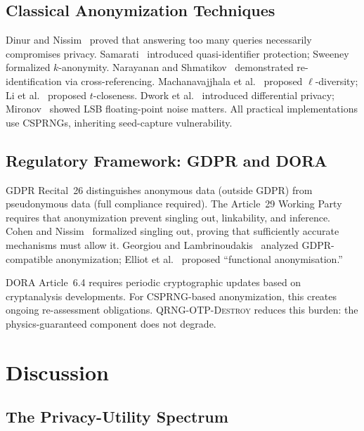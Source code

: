 \documentclass[acmsmall,screen,review,anonymous]{acmart}
\begin{document}
\subsection{Classical Anonymization Techniques}

Dinur and Nissim~\cite{dinur2003revealing} proved that answering too many queries necessarily compromises privacy. Samarati~\cite{samarati2001protecting} introduced quasi-identifier protection; Sweeney~\cite{sweeney2002kanon} formalized $k$-anonymity. Narayanan and Shmatikov~\cite{narayanan2008robust} demonstrated re-identification via cross-referencing. Machanavajjhala et al.~\cite{machanavajjhala2007ldiv} proposed $\ell$-diversity; Li et al.~\cite{li2007tcloseness} proposed $t$-closeness. Dwork et al.~\cite{dwork2006dp} introduced differential privacy; Mironov~\cite{mironov2012significance} showed LSB floating-point noise matters. All practical implementations use CSPRNGs, inheriting seed-capture vulnerability.

\subsection{Regulatory Framework: GDPR and DORA}

GDPR Recital~26 distinguishes anonymous data (outside GDPR) from pseudonymous data (full compliance required). The Article~29 Working Party~\cite{art29wp2014anonymisation} requires that anonymization prevent singling out, linkability, and inference. Cohen and Nissim~\cite{cohen2020singling} formalized singling out, proving that sufficiently accurate mechanisms must allow it. Georgiou and Lambrinoudakis~\cite{georgiou2020gdpr} analyzed GDPR-compatible anonymization; Elliot et al.~\cite{elliot2018functional} proposed ``functional anonymisation.''

DORA Article~6.4 requires periodic cryptographic updates based on cryptanalysis developments. For CSPRNG-based anonymization, this creates ongoing re-assessment obligations. \textsc{QRNG-OTP-Destroy} reduces this burden: the physics-guaranteed component does not degrade.

\section{Discussion}
\label{app:discussion}

\subsection{The Privacy-Utility Spectrum}
\end{document}
